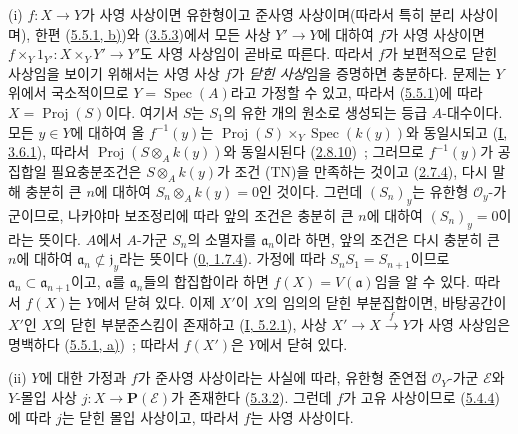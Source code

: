 (i) $f:X\to Y$가 사영 사상이면 유한형이고 준사영 사상이며(따라서 특히
분리 사상이며), 한편 (\hyperref[II.5.5.1-ko]{5.5.1, b)})와
(\hyperref[II.3.5.3-ko]{3.5.3})에서 모든 사상 $Y'\to Y$에 대하여
$f$가 사영 사상이면
$f\times_Y1_{Y'}:X\times_YY'\to Y'$도 사영 사상임이 곧바로 따른다.
따라서 $f$가 보편적으로 닫힌 사상임을 보이기 위해서는 사영 사상 $f$가
\emph{닫힌 사상}임을 증명하면 충분하다. 문제는 $Y$ 위에서 국소적이므로
$Y=\operatorname{Spec}(A)$라고 가정할 수 있고, 따라서
(\hyperref[II.5.5.1-ko]{5.5.1})에 따라
$X=\operatorname{Proj}(S)$이다. 여기서 $S$는 $S_1$의 유한 개의
원소로 생성되는 등급 $A$-대수이다. 모든 $y\in Y$에 대하여 올
$f^{-1}(y)$는
$\operatorname{Proj}(S)\times_Y\operatorname{Spec}(k(y))$와 동일시되고
(\hyperref[I.3.6.1-ko]{I, 3.6.1}), 따라서
$\operatorname{Proj}(S\otimes_Ak(y))$와 동일시된다
(\hyperref[II.2.8.10-ko]{2.8.10})~; 그러므로 $f^{-1}(y)$가 공집합일
필요충분조건은 $S\otimes_Ak(y)$가 조건 (TN)을 만족하는 것이고
(\hyperref[II.2.7.4-ko]{2.7.4}), 다시 말해 충분히 큰 $n$에 대하여
$S_n\otimes_Ak(y)=0$인 것이다. 그런데 $(S_n)_y$는 유한형
$\mathcal{O}_y$-가군이므로, 나카야마 보조정리에 따라 앞의 조건은
충분히 큰 $n$에 대하여 $(S_n)_y=0$이라는 뜻이다. $A$에서 $A$-가군
$S_n$의 소멸자를 $\mathfrak a_n$이라 하면, 앞의 조건은 다시 충분히 큰
$n$에 대하여 $\mathfrak a_n\not\subset\mathfrak j_y$라는 뜻이다
(\hyperref[0.1.7.4-ko]{0, 1.7.4}). 가정에 따라
$S_nS_1=S_{n+1}$이므로 $\mathfrak a_n\subset\mathfrak a_{n+1}$이고,
$\mathfrak a$를 $\mathfrak a_n$들의 합집합이라 하면
$f(X)=V(\mathfrak a)$임을 알 수 있다. 따라서 $f(X)$는 $Y$에서 닫혀
있다. 이제 $X'$이 $X$의 임의의 닫힌 부분집합이면, 바탕공간이 $X'$인
$X$의 닫힌 부분준스킴이 존재하고
(\hyperref[I.5.2.1-ko]{I, 5.2.1}), 사상
$X'\to X\xrightarrow{f}Y$가 사영 사상임은 명백하다
(\hyperref[II.5.5.1-ko]{5.5.1, a)})~; 따라서 $f(X')$은 $Y$에서 닫혀
있다.

(ii) $Y$에 대한 가정과 $f$가 준사영 사상이라는 사실에 따라, 유한형
준연접 $\mathcal{O}_Y$-가군 $\mathcal{E}$와 $Y$-몰입 사상
$j:X\to\mathbf{P}(\mathcal{E})$가 존재한다
(\hyperref[II.5.3.2-ko]{5.3.2}). 그런데 $f$가 고유 사상이므로
(\hyperref[II.5.4.4-ko]{5.4.4})에 따라 $j$는 닫힌 몰입 사상이고,
따라서 $f$는 사영 사상이다.

